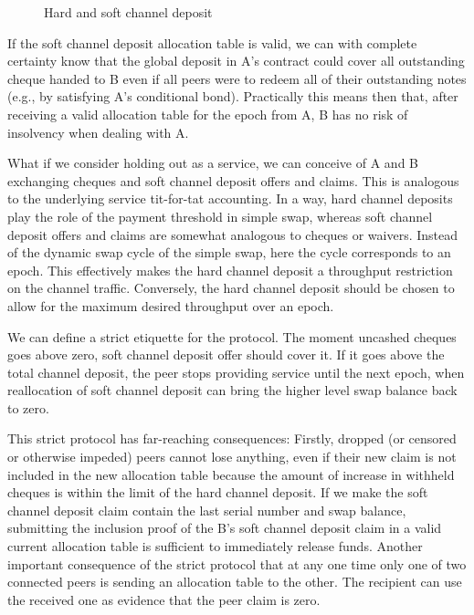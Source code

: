 \begin{center}
\begin{figure}
\begin{center}
\begin{tikzpicture}
\end{tikzpicture}
\end{center}
\caption{Hard and soft channel deposit}
\label{fig:softchanneldeposit}
\end{figure}
\end{center}


If the soft channel deposit allocation table is valid,
we can with complete certainty know that the global deposit in A's contract
 could cover all outstanding cheque handed to B even if all peers were to redeem all of their outstanding notes (e.g., by satisfying A's conditional bond).
Practically this means then that, after receiving a valid allocation table for the epoch from A,
B has no risk of insolvency when dealing with A. 

What if we consider holding out as a service, we can conceive of A and B exchanging cheques and soft channel deposit offers  and claims. This is analogous to the underlying service tit-for-tat accounting. In a way, hard channel deposits play the role of the payment  threshold in simple swap, whereas soft channel deposit offers and claims are somewhat analogous to cheques or waivers.
Instead of the dynamic swap cycle of the simple swap, here the cycle corresponds to an epoch. This effectively makes the hard channel deposit a throughput restriction on the channel traffic. Conversely, the hard channel deposit should  be chosen to allow for the maximum desired throughput over an epoch. 

We can define a strict etiquette for the protocol. The moment uncashed cheques goes above zero, soft channel deposit offer should cover it. If it goes above the total channel deposit, the peer stops providing service until the next epoch, when reallocation of soft channel deposit can bring the higher level swap balance back to zero.

This strict protocol has far-reaching consequences: Firstly, dropped (or censored or otherwise impeded) peers cannot lose anything, even if their new claim is not included in the new allocation table because the amount of increase in withheld cheques is within the limit of the hard channel deposit. 
If we make the soft channel deposit claim contain the last serial number and swap balance, submitting the inclusion proof of the B's soft channel deposit claim in a valid current allocation table is sufficient to immediately release funds. 
Another important consequence of the strict protocol that at any one time only one of two connected peers is sending an allocation table to the other. The recipient can use the received one as evidence that the peer claim is zero.

